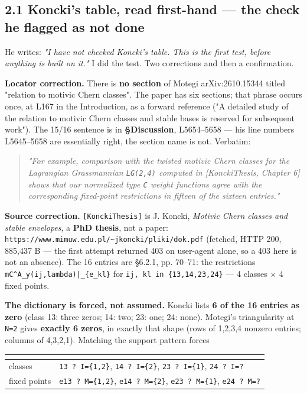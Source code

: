 \documentclass[11pt,a4paper]{article}
\begin{document}
\subsection*{2.1 Koncki's table, read first-hand --- the check he flagged as not done}

He writes: \emph{"I have not checked Koncki's table. This is the first test, before anything is built on it."} I did the test. Two corrections and then a confirmation.

\textbf{Locator correction.} There is \textbf{no section} of Motegi arXiv:2610.15344 titled "relation to motivic Chern classes". The paper has six sections; that phrase occurs once, at L167 in the Introduction, as a forward reference ("A detailed study of the relation to motivic Chern classes and stable bases is reserved for subsequent work"). The 15/16 sentence is in \textbf{\S{}Discussion}, L5654--5658 --- his line numbers L5645--5658 are essentially right, the section name is not. Verbatim:

\begin{quote}\itshape "For example, comparison with the twisted motivic Chern classes for the Lagrangian Grassmannian \mbox{\texttt{LG(2,4)}} computed in [KonckiThesis, Chapter 6] shows that our normalized type \mbox{\texttt{C}} weight functions agree with the corresponding fixed-point restrictions in fifteen of the sixteen entries."\end{quote}

\textbf{Source correction.} \mbox{\texttt{[KonckiThesis]}} is J. Koncki, \emph{Motivic Chern classes and stable envelopes}, a \textbf{PhD thesis}, not a paper: \mbox{\texttt{https://www.mimuw.edu.pl/\textasciitilde{}jkoncki/pliki/dok.pdf}} (fetched, HTTP 200, 885,437 B --- the first attempt returned 403 on user-agent alone, so a 403 here is not an absence). The 16 entries are \S{}6.2.1, pp. 70--71: the restrictions \mbox{\texttt{mC\textasciicircum{}A\_y(ij,lambda)|\_\{e\_kl\}}} for \mbox{\texttt{ij, kl in \{13,14,23,24\}}} --- 4 classes $\times$ 4 fixed points.

\textbf{The dictionary is forced, not assumed.} Koncki lists \textbf{6 of the 16 entries as zero} (class 13: three zeros; 14: two; 23: one; 24: none). Motegi's triangularity at \mbox{\texttt{N=2}} gives \textbf{exactly 6 zeros}, in exactly that shape (rows of 1,2,3,4 nonzero entries; columns of 4,3,2,1). Matching the support pattern forces

\begin{center}\footnotesize
\begin{tabular}{@{}p{}p{}@{}}
\hline
\textbf{} & \textbf{}\\ \hline
classes & \mbox{\texttt{13 ? I=\{1,2\}}}, \mbox{\texttt{14 ? I=\{2\}}}, \mbox{\texttt{23 ? I=\{1\}}}, \mbox{\texttt{24 ? I=?}}\\
fixed points & \mbox{\texttt{e13 ? M=\{1,2\}}}, \mbox{\texttt{e14 ? M=\{2\}}}, \mbox{\texttt{e23 ? M=\{1\}}}, \mbox{\texttt{e24 ? M=?}}\\
\hline\end{tabular}\end{center}
\end{document}
